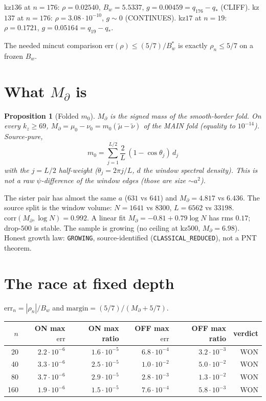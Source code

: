 \documentclass[11pt]{article}
\newtheorem{prop}{Proposition}
\begin{document}
kz$136$ at $n=176$:
$\rho=0.02540$, $B_w=5.5337$,
$g=0.00459=q_{176}-q_*$ (CLIFF).
kz$137$ at $n=176$:
$\rho=3.08\cdot10^{-10}$, $g\sim0$
(CONTINUES).
kz$17$ at $n=19$:
$\rho=0.1721$, $g=0.05164=q_{19}-q_*$.

The needed mincut comparison
$\mathrm{err}(\rho)\le(5/7)/B_w^*$
is exactly $\rho_n\le 5/7$ on a frozen
$B_w$.

\section{What $M_\partial$ is}\label{sec:md}

\begin{prop}[Folded $m_0$]\label{prop:md}
$M_\partial$ is the signed mass of the
smooth-border fold.
On every $k_z\ge 69$,
$M_\partial=\mu_0-\nu_0=m_0(\tilde\mu-\tilde\nu)$
of the MAIN fold (equality to $10^{-14}$).
Source-pure,
\[
m_0
=\sum_{j=1}^{L/2}
\frac{2}{L}\,(1-\cos\theta_j)\,d_j
\]
with the $j=L/2$ half-weight
($\theta_j=2\pi j/L$, $d$ the window
spectral density).
This is \emph{not} a raw
$\psi$-difference of the window edges
(those are size $\sim a^2$).
\end{prop}

The sister pair has almost the same $a$
($631$ vs $641$) and
$M_\partial=4.817$ vs $6.436$.
The source split is the window volume:
$N=1641$ vs $8300$, $L=6562$ vs $33198$.
$\mathrm{corr}(M_\partial,\log N)=0.992$.
A linear fit $M_\partial=-0.81+0.79\log N$
has rms $0.17$; drop-$500$ is stable.
The sample is growing (no ceiling at
kz$500$, $M_\partial=6.98$).
Honest growth law: \texttt{GROWING},
source-identified (\texttt{CLASSICAL\_REDUCED}),
not a PNT theorem.

\section{The race at fixed depth}\label{sec:race}

$\mathrm{err}_n=|\rho_n|/B_w$ and
$\mathrm{margin}=(5/7)/(M_\partial+5/7)$.

\begin{center}
\small
\begin{tabular}{rrrrrr}
\toprule
$n$ & ON max $\mathrm{err}$ & ON max ratio
& OFF max $\mathrm{err}$ & OFF max ratio & verdict \\
\midrule
20 & $2.2\cdot10^{-6}$ & $1.6\cdot10^{-5}$
& $6.8\cdot10^{-4}$ & $3.2\cdot10^{-3}$ & WON \\
40 & $3.3\cdot10^{-6}$ & $2.5\cdot10^{-5}$
& $1.0\cdot10^{-2}$ & $5.0\cdot10^{-2}$ & WON \\
80 & $3.7\cdot10^{-6}$ & $2.9\cdot10^{-5}$
& $2.8\cdot10^{-3}$ & $1.3\cdot10^{-2}$ & WON \\
160 & $1.9\cdot10^{-6}$ & $1.5\cdot10^{-5}$
& $7.6\cdot10^{-4}$ & $5.8\cdot10^{-3}$ & WON \\
\bottomrule
\end{tabular}
\end{center}
\end{document}
